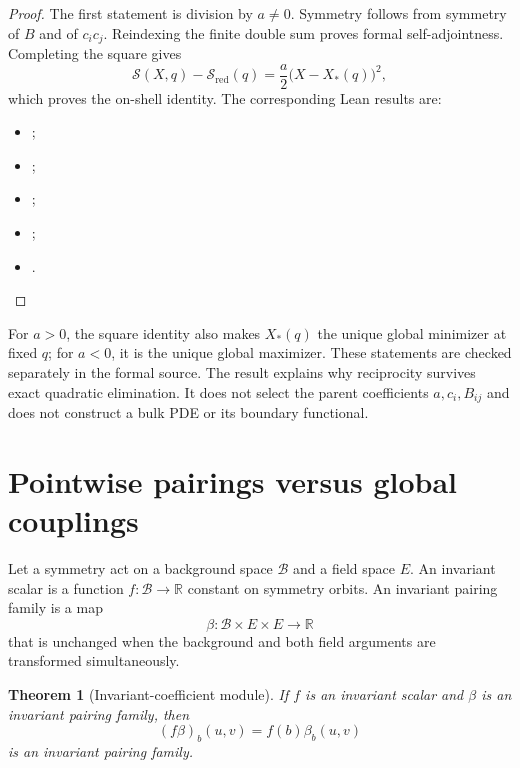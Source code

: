 \documentclass[11pt,a4paper]{article}
\newtheorem{theorem}{Theorem}[section]
\theoremstyle{definition}
\theoremstyle{remark}
\newcommand{\R}{\mathbb{R}}
\newcommand{\Sact}{\mathcal{S}}
\begin{document}
\begin{proof}
The first statement is division by $a\ne0$. Symmetry follows from symmetry of
$B$ and of $c_ic_j$. Reindexing the finite double sum proves formal
self-adjointness. Completing the square gives
\begin{equation}
  \Sact(X,q)-\Sact_{\mathrm{red}}(q)
  =\frac{a}{2}\bigl(X-X_*(q)\bigr)^2,
\end{equation}
which proves the on-shell identity. The corresponding Lean results are:
\begin{itemize}
  \item {};
  \item {};
  \item {};
  \item {};
  \item {}.
\end{itemize}
\end{proof}

For $a>0$, the square identity also makes $X_*(q)$ the unique global minimizer
at fixed $q$; for $a<0$, it is the unique global maximizer. These statements
are checked separately in the formal source. The result explains why
reciprocity survives exact quadratic elimination. It does not select the
parent coefficients $a,c_i,B_{ij}$ and does not construct a bulk PDE or its
boundary functional.

\section{Pointwise pairings versus global couplings}
\label{sec:pairings}

Let a symmetry act on a background space $\mathcal{B}$ and a field space
$E$. An invariant scalar is a function $f:\mathcal{B}\to\R$ constant on
symmetry orbits. An invariant pairing family is a map
\begin{equation}
  \beta:\mathcal{B}\times E\times E\longrightarrow\R
\end{equation}
that is unchanged when the background and both field arguments are transformed
simultaneously.

\begin{theorem}[Invariant-coefficient module]
If $f$ is an invariant scalar and $\beta$ is an invariant pairing family, then
\begin{equation}
  (f\beta)_b(u,v)=f(b)\beta_b(u,v)
\end{equation}
is an invariant pairing family.
\end{theorem}
\end{document}
